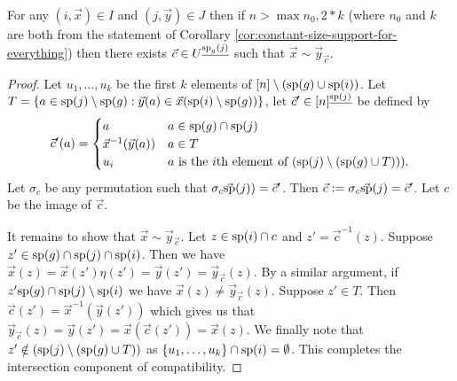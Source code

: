\documentclass[../paper.tex]{subfiles}
\begin{document}
\begin{lem}
	\label{lem:permutation-row-column}
	For any $(i, \vec{x}) \in I$ and $(j, \vec{y}) \in J$ then if $n > \max{n_0, 2*k}$ (where $n_0$ and $k$ are both from the statement of Corollary \ref{cor:constant-size-support-for-everything}) then there exists $\vec{c} \in U^{\underline{\text{sp}_g(j)}}$ such that $\vec{x} \sim \vec{y}_{\vec{c}}$.
\end{lem}
\begin{proof}
	Let $u_1, \ldots , u_k$ be the first $k$
	elements of $[n] \setminus (\text{sp}(g) \cup \text{sp}(i))$. Let $T = \{a \in
	\text{sp}(j) \setminus \text{sp}(g) : \vec{y}(a) \in \vec{x}(\text{sp}(i) \setminus
	\text{sp}(g))\}$, let $\vec{c}' \in [n]^{\underline{\text{sp}(j)}}$ be defined by
	\[
		\vec{c}' (a) =
		\begin{cases}
			a                        & a \in \text{sp}(g) \cap \text{sp}(j)                                     \\
			\vec{x}^{-1}(\vec{y}(a)) & a \in T                                                            \\
			u_{i}                    & \text{$a$ is the $i$th element of $(\text{sp}(j) \setminus (\text{sp}(g) 
			\cup T)))$}.
		\end{cases}
	\]
	Let $\sigma_c$ be any permutation such that $\sigma_c \vec{\text{sp}}(j)) =
	\vec{c}'$. Then $\vec{c} := \sigma_c \vec{\text{sp}}(j) = \vec{c}'$. Let $c$ be
	the image of $\vec{c}$.
		
	It remains to show that $\vec{x} \sim \vec{y}_{\vec{c}}$. Let $z \in \text{sp}(i)
	\cap c$ and $z' = \vec{c}^{-1}(z)$. Suppose $z' \in \text{sp}(g)\cap \text{sp}(j)
	\cap \text{sp}(i)$. Then we have $\vec{x}(z) = \vec{x}(z') \eta (z') =
	\vec{y}(z') = \vec{y}_{\vec{c}}(z)$. By a similar argument, if $z' \text{sp}(g)
	\cap \text{sp}(j) \setminus \text{sp}(i)$ we have $\vec{x}(z) \neq
	\vec{y}_{\vec{c}}(z)$. Suppose $z' \in T$. Then $\vec{c}(z') =
	\vec{x}^{-1}(\vec{y}(z'))$ which gives us that $\vec{y}_{\vec{c}}(z) =
	\vec{y}(z') = \vec{x}(\vec{c}(z')) = \vec{x}(z)$. We finally note that $z'
	\notin (\text{sp}(j) \setminus (\text{sp}(g) \cup T))$ as $\{u_1 , \ldots , u_k\}
	\cap \text{sp}(i) = \emptyset$. This completes the intersection component of
	compatibility.
		

\end{proof}
\end{document}
